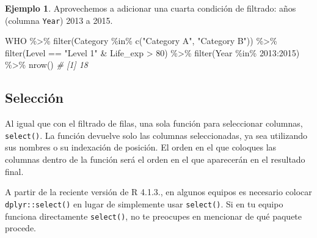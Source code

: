 \documentclass[
]{article}
\newenvironment{Shaded}{\begin{snugshade}}{\end{snugshade}}
\newcommand{\CommentTok}[1]{\textcolor[rgb]{0.56,0.35,0.01}{\textit{#1}}}
\newcommand{\DecValTok}[1]{\textcolor[rgb]{0.00,0.00,0.81}{#1}}
\newcommand{\FunctionTok}[1]{\textcolor[rgb]{0.00,0.00,0.00}{#1}}
\newcommand{\NormalTok}[1]{#1}
\newcommand{\SpecialCharTok}[1]{\textcolor[rgb]{0.00,0.00,0.00}{#1}}
\newcommand{\StringTok}[1]{\textcolor[rgb]{0.31,0.60,0.02}{#1}}
\theoremstyle{definition}
\theoremstyle{definition}
\newtheorem{example}{Ejemplo}[section]
\theoremstyle{definition}
\theoremstyle{definition}
\theoremstyle{remark}
\begin{document}
\begin{example}

Aprovechemos a adicionar una cuarta condición de filtrado: años (columna \texttt{Year}) 2013 a 2015.

\begin{Shaded}
\begin{Highlighting}[]
\NormalTok{WHO }\SpecialCharTok{\%\textgreater{}\%} 
  \FunctionTok{filter}\NormalTok{(Category }\SpecialCharTok{\%in\%} \FunctionTok{c}\NormalTok{(}\StringTok{"Category A"}\NormalTok{, }\StringTok{"Category B"}\NormalTok{)) }\SpecialCharTok{\%\textgreater{}\%}  
  \FunctionTok{filter}\NormalTok{(Level }\SpecialCharTok{==} \StringTok{"Level 1"} \SpecialCharTok{\&}\NormalTok{ Life\_exp }\SpecialCharTok{\textgreater{}} \DecValTok{80}\NormalTok{) }\SpecialCharTok{\%\textgreater{}\%} 
  \FunctionTok{filter}\NormalTok{(Year }\SpecialCharTok{\%in\%} \DecValTok{2013}\SpecialCharTok{:}\DecValTok{2015}\NormalTok{) }\SpecialCharTok{\%\textgreater{}\%} 
  \FunctionTok{nrow}\NormalTok{()}
\CommentTok{\# [1] 18}
\end{Highlighting}
\end{Shaded}

\end{example}

\hypertarget{selecciuxf3n}{%
\subsection{Selección}\label{selecciuxf3n}}

Al igual que con el filtrado de filas, una sola función para seleccionar columnas, \texttt{select()}. La función devuelve solo las columnas seleccionadas, ya sea utilizando sus nombres o su indexación de posición. El orden en el que coloques las columnas dentro de la función será el orden en el que aparecerán en el resultado final.

\begin{rmdtip}
A partir de la reciente versión de R 4.1.3., en algunos equipos es necesario colocar \texttt{dplyr::select()} en lugar de simplemente usar \texttt{select()}. Si en tu equipo funciona directamente \texttt{select()}, no te preocupes en mencionar de qué paquete procede.
\end{rmdtip}
\end{document}
